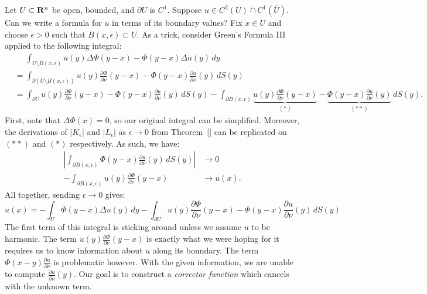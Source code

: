 \begin{example}
	Let $U \subset \mathbf{R}^n$ be open, bounded, and $\partial U$ is $C^1$. Suppose $u \in C^2(U)\cap C^1(\overline{U})$. Can we write a formula for $u$ in terms of its boundary values? Fix $x \in U$ and choose $\epsilon > 0$ such that $B(x,\epsilon) \subset U$. As a trick, consider Green's Formula III applied to the following integral:
	\begin{align*}
		&\phantom{=}\int_{U \setminus B(x,\epsilon)}^{} u(y) \Delta \Phi(y-x) - \Phi(y-x)\Delta u(y)\,dy\\
		&= \int_{\partial (U \setminus B(x,\epsilon))}^{} u(y) \frac{\partial \Phi}{\partial \nu}(y-x) - \Phi(y-x) \frac{\partial u}{\partial \nu}(y)\,dS(y) \\
		&= \int_{\partial U}^{} u(y) \frac{\partial \Phi}{\partial \nu}(y-x) - \Phi(y-x) \frac{\partial u}{\partial \nu}(y)\,dS(y) - \int_{\partial B(x,\epsilon)}^{} \underbrace{u(y) \frac{\partial \Phi}{\partial \nu}(y-x)}_{(\ast)} - \underbrace{\Phi(y-x) \frac{\partial u}{\partial \nu}(y)}_{(\ast\ast)}\,dS(y).
	\end{align*}
	First, note that $\Delta \Phi(x) = 0$, so our original integral can be simplified. Moreover, the derivations of $|K_\epsilon|$ and $|L_\epsilon|$ as $\epsilon \rightarrow 0$ from Theorem~\ref{} can be replicated on $(\ast\ast)$ and $(\ast)$ respectively. As such, we have:
	\begin{align*}
		\left| \int_{\partial B(x,\epsilon)}^{} \Phi(y-x) \frac{\partial u }{\partial \nu}(y)\,dS(y) \right| &\rightarrow 0 \\
		-\int_{\partial B(x,\epsilon)}^{}u(y) \frac{\partial \Phi}{\partial \nu}(y-x) &\rightarrow u(x). 
	\end{align*}
	All together, sending $\epsilon \rightarrow 0$ gives:
	\[
		u(x) = -\int_{U}^{} \Phi(y-x)\Delta u(y)\,dy -\int_{\partial U}^{} u(y) \frac{\partial \Phi}{\partial \nu}(y-x) - \Phi(y-x) \frac{\partial u}{\partial \nu}(y) \,dS(y)
	\]
	The first term of this integral is sticking around unless we assume $u$ to be harmonic. The term  $u(y) \frac{\partial \Phi}{\partial \nu}(y-x)$ is exactly what we were hoping for \textemdash it requires us to know information about $u$ along its boundary. The term $\Phi(x-y) \frac{\partial u}{\partial \nu}$ is problematic however. With the given information, we are unable to compute $\frac{\partial u }{\partial \nu}(y)$. Our goal is to construct a \textit{corrector function} which cancels with the unknown term.
\end{example}


